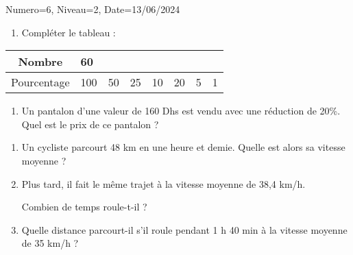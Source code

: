 \documentclass[a4paper,12pt]{article}
\begin{document}
\begin{Maquette}[DS]{Numero=6, Niveau=2, Date=13/06/2024}
\begin{exercice}
\begin{enumerate}
\item{} Compléter le tableau :
\end{enumerate}
 
\begin{tabular}{|c|C{1cm}|C{1cm}|C{1cm}|C{1cm}|C{1cm}|C{1cm}|C{1cm}|}
\hline 
Nombre & 60 &  &  &  &  &  &  \\ 
\hline 
Pourcentage & 100 & 50 & 25 & 10 & 20 & 5 & 1 \\ 
\hline 
\end{tabular} 
\begin{enumerate}
\item{} Un pantalon d'une valeur de 160 Dhs est vendu avec une réduction de 20\%. Quel est le prix de ce pantalon ?
\end{enumerate}
\anserline[4]
\end{exercice}

\begin{exercice}
\begin{enumerate}
\item{} Un cycliste parcourt 48 km en une heure et demie. Quelle est alors sa vitesse moyenne ?
\par\anserline[5]
\item{} Plus tard, il fait le même trajet à la vitesse moyenne de 38,4 km/h.\par
 Combien de temps roule-t-il ?
\par\anserline[5]
\item{} Quelle distance parcourt-il s'il roule pendant 1 h 40 min à la vitesse moyenne de 35 km/h ?
\par\anserline[5]
\end{enumerate}
\end{exercice}
\end{Maquette}
\end{document}
